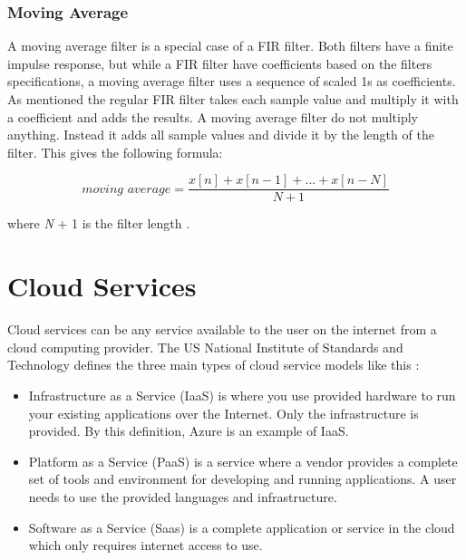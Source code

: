 \documentclass[english, a4paper]{report}
\begin{document}
{{{            \subsubsection{Moving Average}\label{moving average}
            {
                A moving average filter is a special case of a FIR filter. Both filters have a finite impulse response, but while a FIR filter have coefficients based on the filters specifications, a moving average filter uses a sequence of scaled 1s as coefficients. As mentioned the regular FIR filter takes each sample value and multiply it with a coefficient and adds the results. A moving average filter do not multiply anything. Instead it adds all sample values and divide it by the length of the filter. This gives the following formula:
                
                \begin{equation}\label{eq:movAvg}
                    \textit{moving average} = \frac{x[n] + x[n - 1] + ... + x[n - N]}{N + 1}
                \end{equation}
                
                where \textit{N} + 1 is the filter length \cite{movAvgFilter}.
            }
        }
    }
   
    \section{Cloud Services} \label{cloudServices}
    {
        Cloud services can be any service available to the user on the internet from a cloud computing provider. The US National Institute of Standards and Technology defines the three main types of cloud service models like this \cite{cloudComputing}:
        
        \begin{itemize}
            \item Infrastructure as a Service (IaaS) is where you use provided hardware to run your existing applications over the Internet. Only the infrastructure is provided. By this definition, Azure is an example of IaaS.
            \item Platform as a Service (PaaS) is a service where a vendor provides a complete set of tools and environment for developing and running applications. A user needs to use the provided languages and infrastructure.
            \item Software as a Service (Saas) is a complete application or service in the cloud which only requires internet access to use.
        \end{itemize}
    }
    
}
\end{document}
